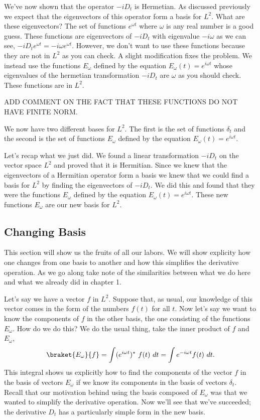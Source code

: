 We've now shown that the operator $-iD_t$ is Hermetian.  As discussed previously we expect that the eigenvectors of this operator form a basis for $L^2$.  What are these eigenvectors? The set of functions $e^{\omega t}$ where $\omega$ is any real number is a good guess.  These functions are eigenvectors of $-iD_t$ with eigenvalue $-i\omega$ as we can see, $-iD_te^{\omega t} = -i \omega e^{\omega t}$.  However, we don't want to use these functions because they are not in $L^2$ as you can check.  A slight modification fixes the problem.  We instead use the functions $E_\omega$ defined by the equation $E_\omega(t) = e^{i\omega t}$ whose eigenvalues of the hermetian transformation $-iD_t$ are $\omega$ as you should check.  These functions are in $L^2$.

ADD COMMENT ON THE FACT THAT THESE FUNCTIONS DO NOT HAVE FINITE NORM.

We now have two different bases for $L^2$.  The first is the set of functions $\delta_t$ and the second is the set of functions $E_\omega$ defined by the equation $E_\omega(t) = e^{i\omega t}$.

Let's recap what we just did.  We found a linear transformation $-iD_t$ on the vector space $L^2$ and proved that it is Hermitian.  Since we knew that the eigenvectors of a Hermitian operator form a basis we knew that we could find a basis for $L^2$ by finding the eigenvectors of $-iD_t$.  We did this and found that they were the functions $E_\omega$ defined by the equation $E_\omega(t) = e^{i\omega t}$.  These new functions $E_\omega$ are our new basis for $L^2$.

\subsection{Changing Basis}
This section will show us the fruits of all our labors.  We will show explicity how one changes from one basis to another and how this simplifies the derivative operation.  As we go along take note of the similarities between what we do here and what we already did in chapter 1.

Let's say we have a vector $f$ in $L^2$.  Suppose that, as usual, our knowledge of this vector comes in the form of the numbers $f(t)$ for all $t$.  Now let's say we want to know the components of $f$ in the other basis, the one consisting of the functions $E_\omega$.  How do we do this?  We do the usual thing, take the inner product of $f$ and $E_\omega$,
\begin{displaymath} \braket{E_\omega}{f} = \int (e^{i\omega t})^*~f(t)~dt = \int e^{-i\omega t} f(t)~dt. \end{displaymath}
This integral shows us explicitly how to find the components of the vector $f$ in the basis of vectors $E_\omega$ if we know its components in the basis of vectors $\delta_{t}$.  Recall that our motivation behind using the basis composed of $E_\omega$ was that we wanted to simplify the derivative operation.  Now we'll see that we've succeeded; the derivative $D_t$ has a particularly simple form in the new basis.


